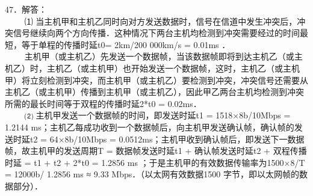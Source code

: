 47．解答： \\
$\qquad$ ⑴ 当主机甲和主机乙同时向对方发送数据时，信号在信道中发生冲突后，冲突信号继续向两个方向传播．这种情况下两台主机均检测到冲突需要经过的时间最短，等于单程的传播时延t0= 2km/200 000km/s =
0.01ms ． \\
$\qquad$ 主机甲（或主机乙）先发送一个数据帧，当该数据帧即将到达主机乙（或主机乙）时，主机乙（或主机甲）也开始发送一个数据帧，这时，主机乙（或主机甲）将立刻检测到冲突，而主机甲（或主机乙）要检测到冲突，冲突信号还需要从主机乙（或主机甲）传播到主机甲（或主机乙），因此甲乙两台主机均检测到冲突所需的最长时间等于双程的传播时延2*t0 = 0.02ms． \\
$\qquad$ ⑵ 主机甲发送一个数据帧的时间，即发送时延t1 = 1518×8b/10Mbps = 1.2144 ms；主机乙每成功收到一个数据帧后，向主机甲发送确认帧，确认帧的发送时延t2 = 64×8b/10Mbps = 0.0512ms；主机甲收到确认帧后，即发送下一数据帧，故主机甲的发送周期T = 数据帧发送时延t1 + 确认帧发送时延t2 + 双程传播时延 = t1 + t2 + 2*t0 = 1.2856 ms ；于是主机甲的有效数据传输率为1500×8/T = 12000b/ 1.2856 ms ≈ 9.33 Mbps．（以太网有效数据1500 字节，即以太网帧的数据部分）．